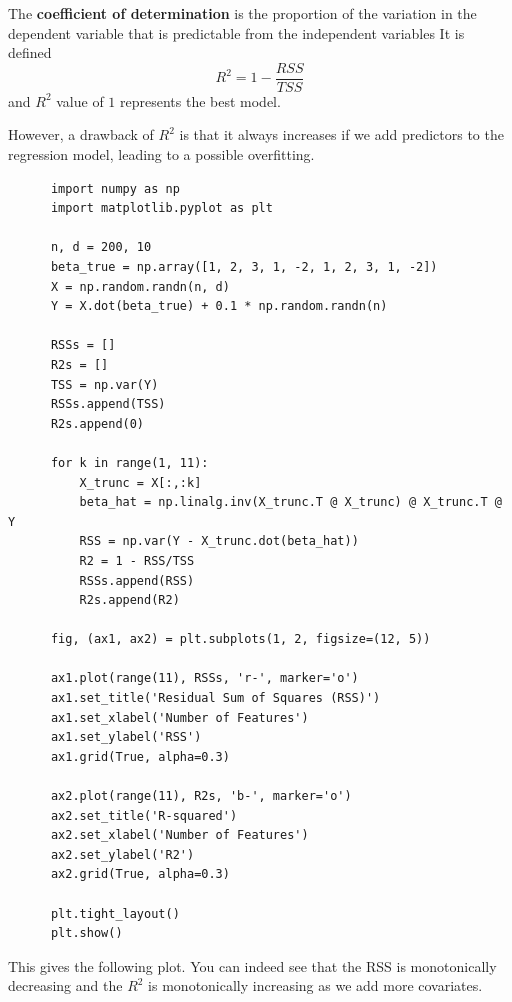   \begin{definition}
    The \textbf{coefficient of determination} is the proportion of the variation in the dependent variable that is predictable from the independent variables It is defined 
    \begin{equation}
      R^2 = 1 - \frac{RSS}{TSS}
    \end{equation}
    and $R^2$ value of $1$ represents the best model. 
  \end{definition}

  However, a drawback of $R^2$ is that it always increases if we add predictors to the regression model, leading to a possible overfitting. 

  \begin{example}
    \begin{lstlisting}
      import numpy as np
      import matplotlib.pyplot as plt

      n, d = 200, 10
      beta_true = np.array([1, 2, 3, 1, -2, 1, 2, 3, 1, -2])
      X = np.random.randn(n, d)
      Y = X.dot(beta_true) + 0.1 * np.random.randn(n) 

      RSSs = []
      R2s = []
      TSS = np.var(Y)
      RSSs.append(TSS)
      R2s.append(0)

      for k in range(1, 11): 
          X_trunc = X[:,:k]
          beta_hat = np.linalg.inv(X_trunc.T @ X_trunc) @ X_trunc.T @ Y 
          RSS = np.var(Y - X_trunc.dot(beta_hat)) 
          R2 = 1 - RSS/TSS  
          RSSs.append(RSS) 
          R2s.append(R2)

      fig, (ax1, ax2) = plt.subplots(1, 2, figsize=(12, 5))

      ax1.plot(range(11), RSSs, 'r-', marker='o')
      ax1.set_title('Residual Sum of Squares (RSS)')
      ax1.set_xlabel('Number of Features')
      ax1.set_ylabel('RSS')
      ax1.grid(True, alpha=0.3)

      ax2.plot(range(11), R2s, 'b-', marker='o')
      ax2.set_title('R-squared')
      ax2.set_xlabel('Number of Features')
      ax2.set_ylabel('R2')
      ax2.grid(True, alpha=0.3)

      plt.tight_layout()
      plt.show() 
    \end{lstlisting} 
    This gives the following plot. You can indeed see that the RSS is monotonically decreasing and the $R^2$ is monotonically increasing as we add more covariates. 


\end{example}
